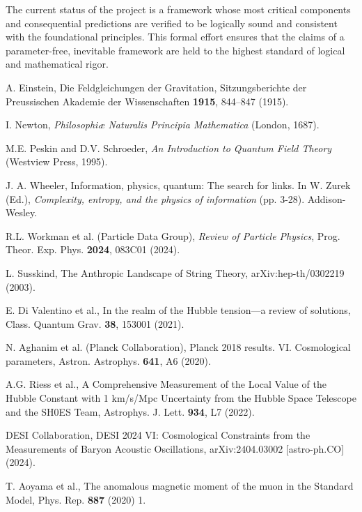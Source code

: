 \documentclass[11pt,a4paper]{article}
\begin{document}
The current status of the project is a framework whose most critical components and consequential predictions are verified to be logically sound and consistent with the foundational principles. This formal effort ensures that the claims of a parameter-free, inevitable framework are held to the highest standard of logical and mathematical rigor.

\begin{thebibliography}{99}

A. Einstein,
Die Feldgleichungen der Gravitation,
Sitzungsberichte der Preussischen Akademie der Wissenschaften \textbf{1915}, 844--847 (1915).

I. Newton,
\textit{Philosophiæ Naturalis Principia Mathematica}
(London, 1687).

M.E. Peskin and D.V. Schroeder,
\textit{An Introduction to Quantum Field Theory}
(Westview Press, 1995).

J. A. Wheeler, Information, physics, quantum: The search for links. In W. Zurek (Ed.), \textit{Complexity, entropy, and the physics of information} (pp. 3-28). Addison-Wesley.

R.L. Workman et al. (Particle Data Group),
\textit{Review of Particle Physics},
Prog. Theor. Exp. Phys. \textbf{2024}, 083C01 (2024).

L. Susskind,
The Anthropic Landscape of String Theory,
arXiv:hep-th/0302219 (2003).

E. Di Valentino et al.,
In the realm of the Hubble tension—a review of solutions,
Class. Quantum Grav. \textbf{38}, 153001 (2021).

N. Aghanim et al. (Planck Collaboration),
Planck 2018 results. VI. Cosmological parameters,
Astron. Astrophys. \textbf{641}, A6 (2020).

A.G. Riess et al.,
A Comprehensive Measurement of the Local Value of the Hubble Constant with 1 km/s/Mpc Uncertainty from the Hubble Space Telescope and the SH0ES Team,
Astrophys. J. Lett. \textbf{934}, L7 (2022).

DESI Collaboration,
DESI 2024 VI: Cosmological Constraints from the Measurements of Baryon Acoustic Oscillations,
arXiv:2404.03002 [astro-ph.CO] (2024).

T. Aoyama et al., The anomalous magnetic moment of the muon in the Standard Model, Phys. Rep. \textbf{887} (2020) 1.


\end{thebibliography}
\end{document}
